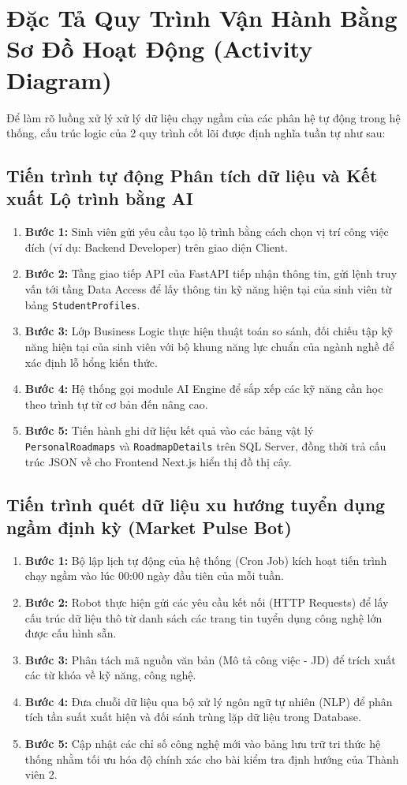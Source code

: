 \section{Đặc Tả Quy Trình Vận Hành Bằng Sơ Đồ Hoạt Động (Activity Diagram)}
Để làm rõ luồng xử lý xử lý dữ liệu chạy ngầm của các phân hệ tự động trong hệ thống, cấu trúc logic của 2 quy trình cốt lõi được định nghĩa tuần tự như sau:

\subsection{Tiến trình tự động Phân tích dữ liệu và Kết xuất Lộ trình bằng AI}
\begin{enumerate}
	\item \textbf{Bước 1:} Sinh viên gửi yêu cầu tạo lộ trình bằng cách chọn vị trí công việc đích (ví dụ: Backend Developer) trên giao diện Client.
	\item \textbf{Bước 2:} Tầng giao tiếp API của FastAPI tiếp nhận thông tin, gửi lệnh truy vấn tới tầng Data Access để lấy thông tin kỹ năng hiện tại của sinh viên từ bảng \texttt{StudentProfiles}.
	\item \textbf{Bước 3:} Lớp Business Logic thực hiện thuật toán so sánh, đối chiếu tập kỹ năng hiện tại của sinh viên với bộ khung năng lực chuẩn của ngành nghề để xác định lỗ hổng kiến thức.
	\item \textbf{Bước 4:} Hệ thống gọi module AI Engine để sắp xếp các kỹ năng cần học theo trình tự từ cơ bản đến nâng cao.
	\item \textbf{Bước 5:} Tiến hành ghi dữ liệu kết quả vào các bảng vật lý \texttt{PersonalRoadmaps} và \texttt{RoadmapDetails} trên SQL Server, đồng thời trả cấu trúc JSON về cho Frontend Next.js hiển thị đồ thị cây.
\end{enumerate}

\subsection{Tiến trình quét dữ liệu xu hướng tuyển dụng ngầm định kỳ (Market Pulse Bot)}
\begin{enumerate}
	\item \textbf{Bước 1:} Bộ lập lịch tự động của hệ thống (Cron Job) kích hoạt tiến trình chạy ngầm vào lúc 00:00 ngày đầu tiên của mỗi tuần.
	\item \textbf{Bước 2:} Robot thực hiện gửi các yêu cầu kết nối (HTTP Requests) để lấy cấu trúc dữ liệu thô từ danh sách các trang tin tuyển dụng công nghệ lớn được cấu hình sẵn.
	\item \textbf{Bước 3:} Phân tách mã nguồn văn bản (Mô tả công việc - JD) để trích xuất các từ khóa về kỹ năng, công nghệ.
	\item \textbf{Bước 4:} Đưa chuỗi dữ liệu qua bộ xử lý ngôn ngữ tự nhiên (NLP) để phân tích tần suất xuất hiện và đối sánh trùng lặp dữ liệu trong Database.
	\item \textbf{Bước 5:} Cập nhật các chỉ số công nghệ mới vào bảng lưu trữ tri thức hệ thống nhằm tối ưu hóa độ chính xác cho bài kiểm tra định hướng của Thành viên 2.
\end{enumerate}